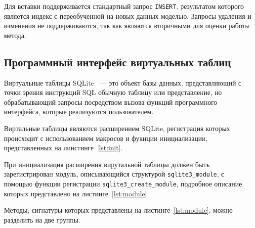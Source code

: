 Для вставки поддерживается стандартный запрос \texttt{INSERT}, результатом
которого является индекс с переобученной на новых данных моделью. Запросы
удаления и изменения не поддерживаются, так как являются вторичными для оценки
работы метода.

\subsection{Программный интерфейс виртуальных таблиц}

Виртуальные таблицы SQLite~\cite{vtable} --- это объект базы данных,
представляющий с точки зрения инструкций SQL обычную таблицу или представление,
но обрабатывающий запросы посредством вызова функций программного интерфейса,
которые реализуются пользователем.

Виртальные таблицы являются расширением SQLite, регистрация которых происходит с
использованием макросов и фукнции инициализации, представленных на
линстинге~\ref{lst:init}.

{
\captionsetup{format=hang,justification=raggedright,
              singlelinecheck=off,width=16cm}
}

При инициализация расширения вирутальной таблицы должен быть зарегистрирован
модуль, описывающийся структурой \texttt{sqlite3\_module}, с помощью функции
регистрации \texttt{sqlite3\_create\_module}, подробное описание которых
представлено на листинге~\ref{lst:module}

{
\captionsetup{format=hang,justification=raggedright,
              singlelinecheck=off,width=16cm}
}


Методы, сигнатуры которых представлены на листинге~\ref{lst:module}, можно
разделить на две группы.

